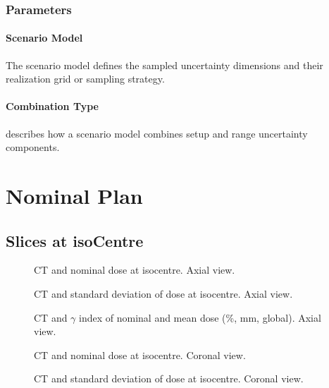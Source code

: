 \documentclass[a4paper]{scrartcl}
\begin{document}
\subsubsection{Parameters}
\paragraph{Scenario Model} The scenario model defines the sampled uncertainty dimensions and their realization grid or sampling strategy.
\paragraph{Combination Type} describes how a scenario model combines setup and range uncertainty components.






\FloatBarrier
\newpage

\section{Nominal Plan}
\subsection{Slices at isoCentre}
\begin{figure}[!b]
  \centering
  
  \caption{CT and nominal dose at isocentre. Axial view.}
\end{figure}

\begin{figure}[!b]
  \centering
  
  \caption{CT and standard deviation of dose at isocentre. Axial view.}
\end{figure}

\begin{figure}[!b]
  \centering
  
  \caption{CT and $\gamma$ index of nominal and mean dose (\gammaDoseAgreement \%, \gammaDoseAgreement mm, global). Axial view.}
\end{figure}

\begin{figure}[!b]
  \centering
  
  \caption{CT and nominal dose at isocentre. Coronal view.}
\end{figure}

\begin{figure}[!b]
  \centering
  
  \caption{CT and standard deviation of dose at isocentre. Coronal view.}
\end{figure}
\end{document}
